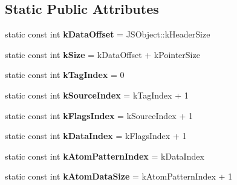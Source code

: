 \subsection*{Static Public Attributes}
\begin{DoxyCompactItemize}
\item 
\hypertarget{classv8_1_1internal_1_1_j_s_reg_exp_a7fb0f9c5fbcb09431c8d2eb6a24754f8}{}static const int {\bfseries k\+Data\+Offset} = J\+S\+Object\+::k\+Header\+Size\label{classv8_1_1internal_1_1_j_s_reg_exp_a7fb0f9c5fbcb09431c8d2eb6a24754f8}

\item 
\hypertarget{classv8_1_1internal_1_1_j_s_reg_exp_a90b7c792009e3057465b57d833b24953}{}static const int {\bfseries k\+Size} = k\+Data\+Offset + k\+Pointer\+Size\label{classv8_1_1internal_1_1_j_s_reg_exp_a90b7c792009e3057465b57d833b24953}

\item 
\hypertarget{classv8_1_1internal_1_1_j_s_reg_exp_a6b776416f183835b0c80536fb03d8c50}{}static const int {\bfseries k\+Tag\+Index} = 0\label{classv8_1_1internal_1_1_j_s_reg_exp_a6b776416f183835b0c80536fb03d8c50}

\item 
\hypertarget{classv8_1_1internal_1_1_j_s_reg_exp_a8829823bf0846b7e0e35f177a7073965}{}static const int {\bfseries k\+Source\+Index} = k\+Tag\+Index + 1\label{classv8_1_1internal_1_1_j_s_reg_exp_a8829823bf0846b7e0e35f177a7073965}

\item 
\hypertarget{classv8_1_1internal_1_1_j_s_reg_exp_a516810e52b83b427e6cce8933e9e0572}{}static const int {\bfseries k\+Flags\+Index} = k\+Source\+Index + 1\label{classv8_1_1internal_1_1_j_s_reg_exp_a516810e52b83b427e6cce8933e9e0572}

\item 
\hypertarget{classv8_1_1internal_1_1_j_s_reg_exp_af16b2b10a9e6f1923103fe6bd46c48de}{}static const int {\bfseries k\+Data\+Index} = k\+Flags\+Index + 1\label{classv8_1_1internal_1_1_j_s_reg_exp_af16b2b10a9e6f1923103fe6bd46c48de}

\item 
\hypertarget{classv8_1_1internal_1_1_j_s_reg_exp_a67adfd18de6fea50f6e492dfdc4b1b04}{}static const int {\bfseries k\+Atom\+Pattern\+Index} = k\+Data\+Index\label{classv8_1_1internal_1_1_j_s_reg_exp_a67adfd18de6fea50f6e492dfdc4b1b04}

\item 
\hypertarget{classv8_1_1internal_1_1_j_s_reg_exp_ad68a24d05c9c76742bf98370f73ddde8}{}static const int {\bfseries k\+Atom\+Data\+Size} = k\+Atom\+Pattern\+Index + 1\label{classv8_1_1internal_1_1_j_s_reg_exp_ad68a24d05c9c76742bf98370f73ddde8}


\end{DoxyCompactItemize}
